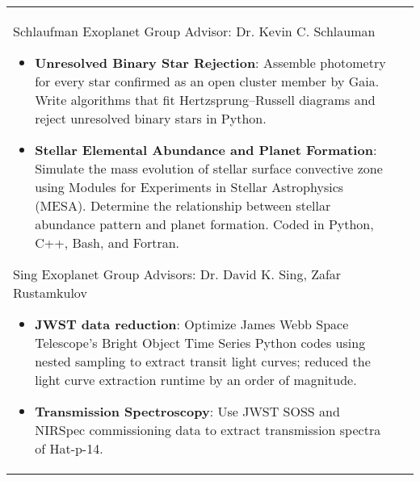 \documentclass[10pt]{article} %
\begin{document}




\begin{supertabular}{L{4cm}@{\hskip 0.3in}L{13cm}} %

{Schlaufman Exoplanet Group} %
{Advisor: Dr. Kevin C. Schlauman} %
{\begin{itemize}
\vspace{-0.4cm}
    \item \textbf{Unresolved Binary Star Rejection}:  Assemble photometry for every star confirmed as an open cluster member by Gaia. Write algorithms that fit Hertzsprung–Russell diagrams and reject unresolved binary stars in Python.
    \item \textbf{Stellar Elemental Abundance and Planet Formation}: Simulate the mass evolution of stellar surface convective zone using Modules for Experiments in Stellar Astrophysics (MESA). Determine the relationship between stellar abundance pattern and planet formation. Coded in Python, C++, Bash, and Fortran. 
\end{itemize}} %

{Sing Exoplanet Group} %
{Advisors: Dr. David K. Sing, Zafar Rustamkulov} %
{\begin{itemize}
\vspace{-0.4cm}
    \item \textbf{JWST data reduction}: Optimize James Webb Space Telescope's Bright Object Time Series Python codes using nested sampling to extract transit light curves; reduced the light curve extraction runtime by an order of magnitude.
    \item \textbf{Transmission Spectroscopy}: Use JWST SOSS and NIRSpec commissioning data to extract transmission spectra of Hat-p-14. 
\end{itemize}} %


\end{supertabular}
\end{document}
